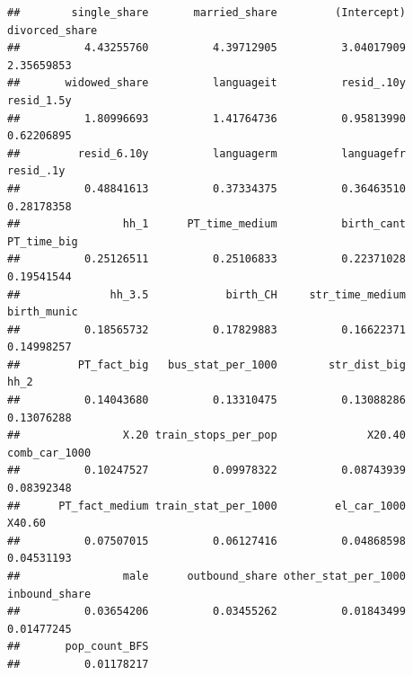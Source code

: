 \documentclass[
]{article}
\newenvironment{Shaded}{\begin{snugshade}}{\end{snugshade}}
\newcommand{\FloatTok}[1]{\textcolor[rgb]{0.00,0.00,0.81}{#1}}
\newcommand{\NormalTok}[1]{#1}
\newcommand{\SpecialCharTok}[1]{\textcolor[rgb]{0.00,0.00,0.00}{#1}}
\begin{document}
\begin{verbatim}
##        single_share       married_share         (Intercept)      divorced_share 
##          4.43255760          4.39712905          3.04017909          2.35659853 
##       widowed_share          languageit          resid_.10y          resid_1.5y 
##          1.80996693          1.41764736          0.95813990          0.62206895 
##         resid_6.10y          languagerm          languagefr           resid_.1y 
##          0.48841613          0.37334375          0.36463510          0.28178358 
##                hh_1      PT_time_medium          birth_cant         PT_time_big 
##          0.25126511          0.25106833          0.22371028          0.19541544 
##              hh_3.5            birth_CH     str_time_medium         birth_munic 
##          0.18565732          0.17829883          0.16622371          0.14998257 
##         PT_fact_big   bus_stat_per_1000        str_dist_big                hh_2 
##          0.14043680          0.13310475          0.13088286          0.13076288 
##                X.20 train_stops_per_pop              X20.40       comb_car_1000 
##          0.10247527          0.09978322          0.08743939          0.08392348 
##      PT_fact_medium train_stat_per_1000         el_car_1000              X40.60 
##          0.07507015          0.06127416          0.04868598          0.04531193 
##                male      outbound_share other_stat_per_1000       inbound_share 
##          0.03654206          0.03455262          0.01843499          0.01477245 
##       pop_count_BFS 
##          0.01178217
\end{verbatim}

\begin{Shaded}
\end{Shaded}
\end{document}
